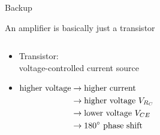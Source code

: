 \documentclass{ethpresentation}
\begin{document}

\appendix

\begin{frame}[standout]
  Backup
\end{frame}

\begin{frame}{An amplifier is basically just a transistor}
  \centering
  \begin{columns}
    \begin{column}{0.5\textwidth}
      \begin{itemize}
        \item Transistor:\\voltage-controlled current source
        \item \(
              \begin{aligned}[t]
                \text{higher voltage} & \rightarrow{} \text{higher current}          \\
                                      & \rightarrow{} \text{higher voltage } V_{R_C} \\
                                      & \rightarrow{} \text{lower voltage } V_{CE}   \\
                                      & \rightarrow{} \text{\ang{180} phase shift}
              \end{aligned}
              \)
      \end{itemize}

    \end{column}
    \begin{column}{0.5\textwidth}



\end{column}
\end{columns}
\end{frame}
\end{document}
